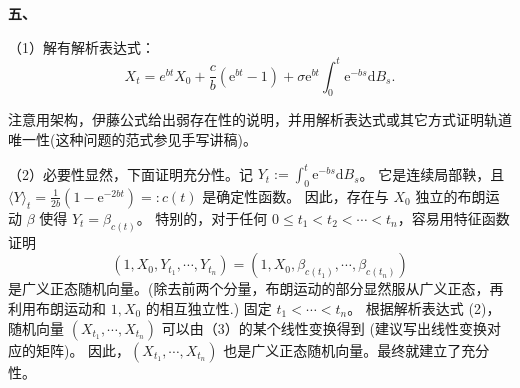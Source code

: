     \textbf{五、}

    （1）解有解析表达式：
    $$X_{t}={e}^{bt} X_{0}+\frac{c}{b}(\mathrm{e}^{bt}-1)+\sigma \mathrm{e}^{bt} \int_{0}^{t} \mathrm{e}^{-bs} \mathrm{d} B_{s}. \tag{2}$$

    注意用架构，伊藤公式给出弱存在性的说明，并用解析表达式或其它方式证明轨道唯一性(这种问题的范式参见手写讲稿)。

    （2）必要性显然，下面证明充分性。记 $Y_{t}:=\int_{0}^{t} \mathrm{e}^{-bs} \mathrm{d} B_{s}$。
    它是连续局部鞅，且 $\langle Y\rangle_{t}=\frac{1}{2b}(1-\mathrm{e}^{-2bt})=: c(t)$ 是确定性函数。
    因此，存在与 $X_{0}$ 独立的布朗运动 $\beta$ 使得 $Y_{t}=\beta_{c(t)}$。
    特别的，对于任何 $0 \leq t_{1}<t_{2}<\cdots<t_{n}$，容易用特征函数证明
    $$(1, X_0, Y_{t_1}, \cdots, Y_{t_n})
    =(1, X_0, \beta_{c(t_1)}, \cdots, \beta_{c(t_n)}) \tag{3}$$
    是广义正态随机向量。(除去前两个分量，布朗运动的部分显然服从广义正态，再利用布朗运动和 $1, X_{0}$ 的相互独立性.) 固定 $t_{1}<\cdots<t_{n}$。
    根据解析表达式 (2)，随机向量 $(X_{t_{1}}, \cdots, X_{t_{n}})$ 可以由（3）的某个线性变换得到 (建议写出线性变换对应的矩阵)。
    因此，$(X_{t_{1}}, \cdots, X_{t_{n}})$ 也是广义正态随机向量。最终就建立了充分性。

